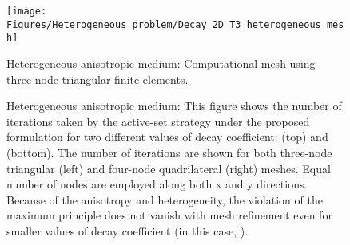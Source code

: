 \documentclass[11pt]{amsart}
\begin{document}
\begin{figure}[htbp]
  \centering
  \texttt{[image: Figures/Heterogeneous\_problem/Decay\_2D\_T3\_heterogeneous\_mesh]}        
\caption{Heterogeneous anisotropic medium: Computational mesh using three-node 
    triangular finite elements.} \label{Fig:Decay_2D_T3_heterogeneous_mesh}
\end{figure}

\begin{figure}[htbp]
  \centering
\caption{Heterogeneous anisotropic medium: This figure shows the number of iterations 
    taken by the active-set strategy under the proposed formulation for two different 
    values of decay coefficient:  (top) and  (bottom). The 
    number of iterations are shown for both three-node triangular (left) and four-node 
    quadrilateral (right) meshes. Equal number of nodes are employed along both x and y 
    directions. Because of the anisotropy and heterogeneity, the violation of the maximum 
    principle does not vanish with mesh refinement even for smaller values of decay 
    coefficient (in this case, ).} 
  \label{Fig:Decay_heterogeneity_iterations_vs_XSeed}
\end{figure}


 
\end{document}
